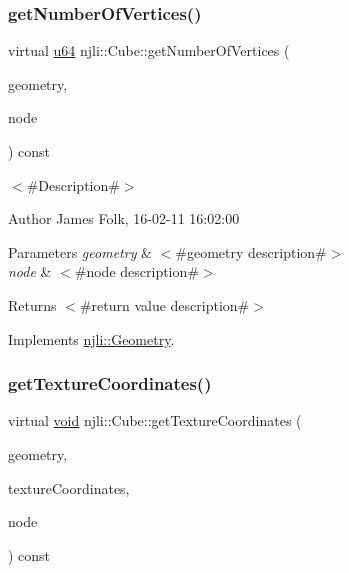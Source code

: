 \subsubsection{\texorpdfstring{get\+Number\+Of\+Vertices()}{getNumberOfVertices()}}
{\footnotesize\ttfamily virtual \mbox{\hyperlink{_util_8h_ad758b7a5c3f18ed79d2fcd23d9f16357}{u64}} njli\+::\+Cube\+::get\+Number\+Of\+Vertices (\begin{DoxyParamCaption}\item[{\mbox{\hyperlink{classnjli_1_1_level_of_detail}{Level\+Of\+Detail}} $\ast$}]{geometry,  }\item[{\mbox{\hyperlink{classnjli_1_1_node}{Node}} $\ast$}]{node }\end{DoxyParamCaption}) const\hspace{0.3cm}{\ttfamily [virtual]}}



$<$\#\+Description\#$>$ 

\begin{DoxyAuthor}{Author}
James Folk, 16-\/02-\/11 16\+:02\+:00
\end{DoxyAuthor}

\begin{DoxyParams}{Parameters}
{\em geometry} & $<$\#geometry description\#$>$ \\
\hline
{\em node} & $<$\#node description\#$>$\\
\hline
\end{DoxyParams}
\begin{DoxyReturn}{Returns}
$<$\#return value description\#$>$ 
\end{DoxyReturn}


Implements \mbox{\hyperlink{classnjli_1_1_geometry_a125699411e1abc464f923fe4e72fc65b}{njli\+::\+Geometry}}.

\mbox{\label{classnjli_1_1_cube_a059f9b19dfbc85491c78613caa3abe72}} 
\subsubsection{\texorpdfstring{get\+Texture\+Coordinates()}{getTextureCoordinates()}}
{\footnotesize\ttfamily virtual \mbox{\hyperlink{_thread_8h_af1e856da2e658414cb2456cb6f7ebc66}{void}} njli\+::\+Cube\+::get\+Texture\+Coordinates (\begin{DoxyParamCaption}\item[{\mbox{\hyperlink{classnjli_1_1_level_of_detail}{Level\+Of\+Detail}} $\ast$}]{geometry,  }\item[{bt\+Vector2 $\ast$$\ast$}]{texture\+Coordinates,  }\item[{\mbox{\hyperlink{classnjli_1_1_node}{Node}} $\ast$}]{node }\end{DoxyParamCaption}) const\hspace{0.3cm}{\ttfamily [virtual]}}



